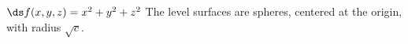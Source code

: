 {$\ds f(x,y,z) = x^2+y^2+z^2$
}
{The level surfaces are spheres, centered at the origin, with radius $\sqrt{c}$.
}